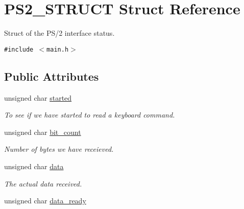 \hypertarget{structPS2__STRUCT}{
\section{PS2\_\-STRUCT Struct Reference}
\label{structPS2__STRUCT}
}
Struct of the PS/2 interface status.  


{\tt \#include $<$main.h$>$}

\subsection*{Public Attributes}
\begin{CompactItemize}
\item 
\hypertarget{structPS2__STRUCT_d1f7ca81c264dbdfed1e9b0f2f8da8fa}{
unsigned char \hyperlink{structPS2__STRUCT_d1f7ca81c264dbdfed1e9b0f2f8da8fa}{started}}
\label{structPS2__STRUCT_d1f7ca81c264dbdfed1e9b0f2f8da8fa}

\begin{CompactList}\small\item\em To see if we have started to read a keyboard command. \item\end{CompactList}\item 
\hypertarget{structPS2__STRUCT_b2c36148c01884baffdb91a0ea1dddc4}{
unsigned char \hyperlink{structPS2__STRUCT_b2c36148c01884baffdb91a0ea1dddc4}{bit\_\-count}}
\label{structPS2__STRUCT_b2c36148c01884baffdb91a0ea1dddc4}

\begin{CompactList}\small\item\em Number of bytes we have receieved. \item\end{CompactList}\item 
\hypertarget{structPS2__STRUCT_e3aee92f88e3efeed2526eb2372138ed}{
unsigned char \hyperlink{structPS2__STRUCT_e3aee92f88e3efeed2526eb2372138ed}{data}}
\label{structPS2__STRUCT_e3aee92f88e3efeed2526eb2372138ed}

\begin{CompactList}\small\item\em The actual data received. \item\end{CompactList}\item 
\hypertarget{structPS2__STRUCT_d753e17bd8f3a627f0f3602abe43add5}{
unsigned char \hyperlink{structPS2__STRUCT_d753e17bd8f3a627f0f3602abe43add5}{data\_\-ready}}
\label{structPS2__STRUCT_d753e17bd8f3a627f0f3602abe43add5}


\end{CompactItemize}
